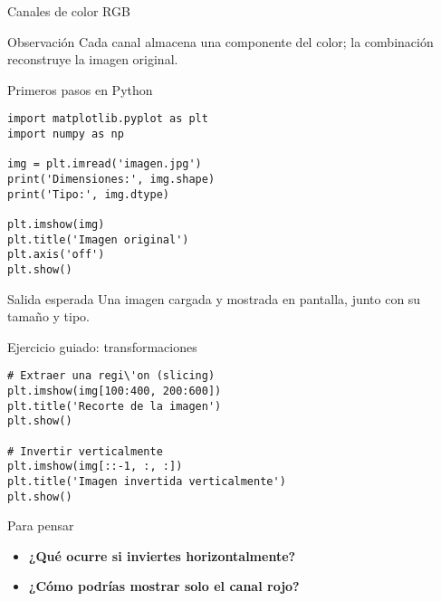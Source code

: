 \documentclass[10pt]{beamer}
\begin{document}
\begin{frame}{Canales de color RGB}
\centering
{}
\vspace{2mm}
\begin{block}{Observaci\'on}
Cada canal almacena una componente del color; la combinaci\'on reconstruye la imagen original.
\end{block}
\end{frame}

\begin{frame}[fragile]{Primeros pasos en Python}
\begin{verbatim}
import matplotlib.pyplot as plt
import numpy as np

img = plt.imread('imagen.jpg')
print('Dimensiones:', img.shape)
print('Tipo:', img.dtype)

plt.imshow(img)
plt.title('Imagen original')
plt.axis('off')
plt.show()
\end{verbatim}
\vspace{2mm}
\begin{block}{Salida esperada}
Una imagen cargada y mostrada en pantalla, junto con su tama\~no y tipo.
\end{block}
\end{frame}

\begin{frame}[fragile]{Ejercicio guiado: transformaciones}
\begin{verbatim}
# Extraer una regi\'on (slicing)
plt.imshow(img[100:400, 200:600])
plt.title('Recorte de la imagen')
plt.show()

# Invertir verticalmente
plt.imshow(img[::-1, :, :])
plt.title('Imagen invertida verticalmente')
plt.show()
\end{verbatim}
\begin{block}{Para pensar}
\begin{itemize}
  \item \textbf{¿Qu\'e ocurre si inviertes horizontalmente?}
  \item \textbf{¿C\'omo podr\'ias mostrar solo el canal rojo?}
\end{itemize}
\end{block}
\end{frame}
\end{document}
